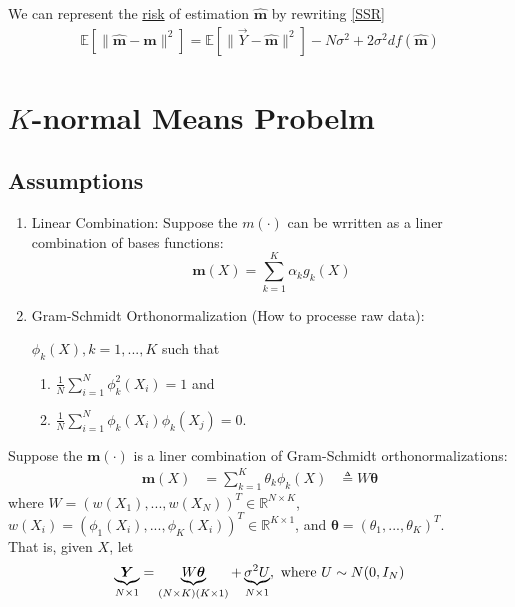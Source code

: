 \documentclass[11pt]{elegantbook}
\begin{document}
We can represent the \underline{risk} of estimation $\hat{\boldsymbol{m}}$ by rewriting \ref{SSR}
\begin{equation}
    \begin{aligned}
        \mathbb{E}\left[\|\hat{\boldsymbol{m}}-\boldsymbol{m}\|^2\right]=\mathbb{E}\left[\|\vec{Y}-\hat{\boldsymbol{m}}\|^2\right]-N\sigma^2+2\sigma^2 df(\hat{\boldsymbol{m}})
    \end{aligned}
    \nonumber
\end{equation}

\section{$K$-normal Means Probelm}
\subsection{Assumptions}
\begin{assumption}
    \begin{enumerate}
        \item Linear Combination: Suppose the $m(\cdot)$ can be wrritten as a liner combination of bases functions:
        $$\boldsymbol{m}(X)=\sum_{k=1}^K \alpha_k g_k(X)$$
        \item Gram-Schmidt Orthonormalization (How to processe raw data):
        \begin{definition}\label{GSO}
            \normalfont
            $\phi_{k}(X), k=1,...,K$ such that
            \begin{enumerate}[(1).]
                \item $\frac{1}{N}\sum_{i=1}^N\phi_{k}^2(X_i)=1$ and
                \item $\frac{1}{N}\sum_{i=1}^N\phi_{k}(X_i)\phi_{k}(X_j)=0$.
            \end{enumerate}
        \end{definition}
    \end{enumerate}
    Suppose the $\boldsymbol{m}(\cdot)$ is a liner combination of Gram-Schmidt orthonormalizations:
    \begin{equation}
        \begin{aligned}
            \boldsymbol{m}(X)&=\sum_{k=1}^K \theta_k \phi_{k}(X)
            &\triangleq W \boldsymbol{\theta}
        \end{aligned}
        \nonumber
    \end{equation}
    where $W=\left(w(X_1),...,w(X_N)\right)^T\in \mathbb{R}^{N\times K}$, $w(X_i)=\left(\phi_1(X_i),...,\phi_K(X_i)\right)^T\in \mathbb{R}^{K\times 1}$, and $\boldsymbol{\theta}=\left(\theta_1,...,\theta_K\right)^T$.\\
    That is, given $X$, let
    \begin{equation}
        \begin{aligned}
            \underbrace{\boldsymbol{Y}}_{N\times 1}=\underbrace{W \boldsymbol{\theta}}_{(N\times K) (K\times 1)}+\underbrace{\sigma^2 U}_{N\times 1}, \textnormal{ where }U\sim N(0,I_N)
        \end{aligned}
        \nonumber
    \end{equation}
\end{assumption}
\end{document}
